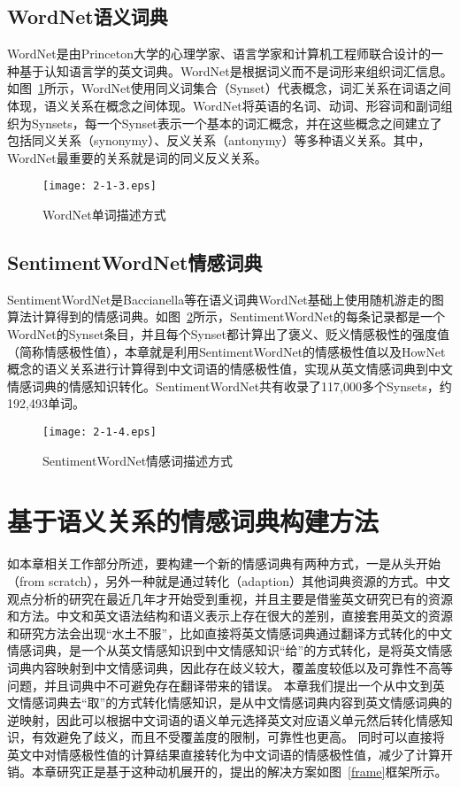 \subsection{WordNet语义词典}
WordNet是由Princeton大学的心理学家、语言学家和计算机工程师联合设计的一种基于认知语言学的英文词典。WordNet是根据词义而不是词形来组织词汇信息。如图~\ref{fig2-2-3}所示，WordNet使用同义词集合（Synset）代表概念，词汇关系在词语之间体现，语义关系在概念之间体现。WordNet将英语的名词、动词、形容词和副词组织为Synsets，每一个Synset表示一个基本的词汇概念，并在这些概念之间建立了包括同义关系（synonymy）、反义关系（antonymy）等多种语义关系。其中，WordNet最重要的关系就是词的同义反义关系。

\begin{figure}[htp]
\centering
\texttt{[image: 2-1-3.eps]}
\caption{WordNet单词描述方式}
\label{fig2-2-3}
\end{figure}

\subsection{SentimentWordNet情感词典}
SentimentWordNet是Baccianella等在语义词典WordNet基础上使用随机游走的图算法计算得到的情感词典。如图~\ref{fig2-2-4}所示，SentimentWordNet的每条记录都是一个WordNet的Synset条目，并且每个Synset都计算出了褒义、贬义情感极性的强度值（简称情感极性值），本章就是利用SentimentWordNet的情感极性值以及HowNet概念的语义关系进行计算得到中文词语的情感极性值，实现从英文情感词典到中文情感词典的情感知识转化。SentimentWordNet共有收录了117,000多个Synsets，约192,493单词。

\begin{figure}[htp]
\centering
\texttt{[image: 2-1-4.eps]}
\caption{SentimentWordNet情感词描述方式}
\label{fig2-2-4}
\end{figure}

\section{基于语义关系的情感词典构建方法}
如本章相关工作部分所述，要构建一个新的情感词典有两种方式，一是从头开始（from scratch），另外一种就是通过转化（adaption）其他词典资源的方式。中文观点分析的研究在最近几年才开始受到重视，并且主要是借鉴英文研究已有的资源和方法。中文和英文语法结构和语义表示上存在很大的差别，直接套用英文的资源和研究方法会出现“水土不服”，比如直接将英文情感词典通过翻译方式转化的中文情感词典，是一个从英文情感知识到中文情感知识“给”的方式转化，是将英文情感词典内容映射到中文情感词典，因此存在歧义较大，覆盖度较低以及可靠性不高等问题，并且词典中不可避免存在翻译带来的错误。
本章我们提出一个从中文到英文情感词典去“取”的方式转化情感知识，是从中文情感词典内容到英文情感词典的逆映射，因此可以根据中文词语的语义单元选择英文对应语义单元然后转化情感知识，有效避免了歧义，而且不受覆盖度的限制，可靠性也更高。
同时可以直接将英文中对情感极性值的计算结果直接转化为中文词语的情感极性值，减少了计算开销。本章研究正是基于这种动机展开的，提出的解决方案如图~\ref{frame}框架所示。

